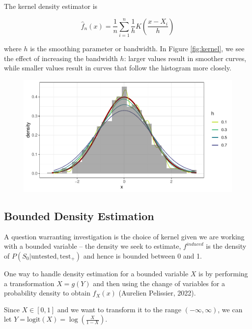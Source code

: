 \documentclass[12pt,twoside]{smiththesis}
\begin{document}
The kernel density estimator is

\[\hat f_n(x) = \frac 1n \sum_{i=1}^n \frac 1h K\left(\dfrac{x-X_i}{h} \right)\]

where \(h\) is the smoothing parameter or bandwidth. In Figure \ref{fig:kernel}, we see the effect of increasing the bandwidth \(h\): larger values result in smoother curves, while smaller values result in curves that follow the histogram more closely.
\begin{figure}

{\centering \includegraphics[width=1\linewidth]{thesis_files/figure-latex/unnamed-chunk-39-1} 

}

\caption{\label{fig:kernel}}\label{fig:unnamed-chunk-39}
\end{figure}
\hypertarget{bounded-density-estimation}{%
\subsection{Bounded Density Estimation}\label{bounded-density-estimation}}

A question warranting investigation is the choice of kernel given we are working with a bounded variable -- the density we seek to estimate, \(f^{induced}\) is the density of \(P(S_0|\text{untested}, \text{test}_+)\) and hence is bounded between 0 and 1.

One way to handle density estimation for a bounded variable \(X\) is by performing a transformation
\(X=g(Y)\) and then using the change of variables for a probability density to obtain \(f_X(x)\) (Aurelien Pelissier, 2022).

Since \(X \in [0,1]\) and we want to transform it to the range \((-\infty,\infty)\), we can let \(Y = \text{logit}(X) = \log \left( \frac{X}{1-X} \right)\).
\end{document}
